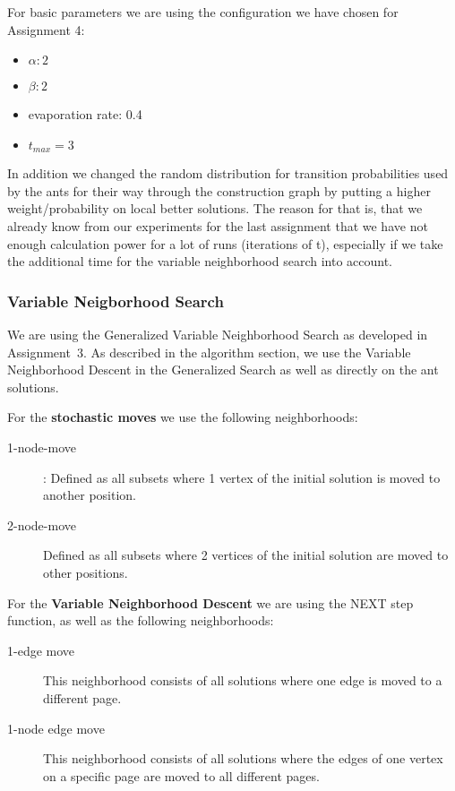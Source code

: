 \documentclass{scrartcl}
\begin{document}
For basic parameters we are using the configuration we have chosen for Assignment 4:
\begin{itemize}
\item $\alpha: 2 $
\item $\beta: 2$
\item evaporation rate: 0.4
\item $t_{max}=3$
\end{itemize}
In addition we changed the random distribution for transition probabilities used by the ants for their 
way through the construction graph
by putting a higher weight/probability on local better solutions. 
The reason for that is, 
that we already know from our experiments for the last assignment that we have not enough calculation
power for a lot of runs (iterations of t), especially if we take the additional time for the
variable neighborhood search into account.

\subsubsection{Variable Neigborhood Search}

We are using the Generalized Variable Neighborhood Search as developed in Assignment~3.
As described in the algorithm section, we use the Variable Neighborhood Descent in the Generalized
Search as well as directly on the ant solutions.

For the \textbf{stochastic moves} we use the following neighborhoods:

\begin{description}
\item[1-node-move]: Defined as all subsets where 1 vertex of the initial solution is moved to another position.
\item[2-node-move] 
Defined as all subsets where 2 vertices of the initial solution are moved to other positions.
\end{description}
 
For the \textbf{Variable Neighborhood Descent} we are using the NEXT step function, as well as the following 
neighborhoods:

\begin{description}
\item[1-edge move] This neighborhood consists of all solutions where one edge is moved to a different page. 
\item[1-node edge move] This neighborhood consists of all solutions where the edges of
	one vertex on a specific page are moved to all different pages. 
\end{description}
\end{document}
